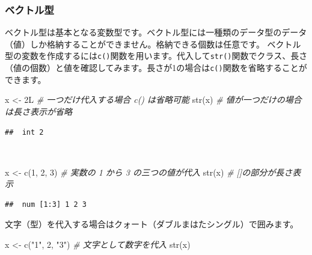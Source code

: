 \documentclass[
  12pt,
]{book}
\newenvironment{Shaded}{\begin{snugshade}}{\end{snugshade}}
\newcommand{\CommentTok}[1]{\textcolor[rgb]{0.56,0.35,0.01}{\textit{#1}}}
\newcommand{\DecValTok}[1]{\textcolor[rgb]{0.00,0.00,0.81}{#1}}
\newcommand{\FunctionTok}[1]{\textcolor[rgb]{0.00,0.00,0.00}{#1}}
\newcommand{\NormalTok}[1]{#1}
\newcommand{\OtherTok}[1]{\textcolor[rgb]{0.56,0.35,0.01}{#1}}
\newcommand{\StringTok}[1]{\textcolor[rgb]{0.31,0.60,0.02}{#1}}
\begin{document}
\hypertarget{ux30d9ux30afux30c8ux30ebux578b}{%
\subsubsection{ベクトル型}\label{ux30d9ux30afux30c8ux30ebux578b}}

ベクトル型は基本となる変数型です。ベクトル型には一種類のデータ型のデータ（値）しか格納することができません。格納できる個数は任意です。 ベクトル型の変数を作成するには\texttt{c()}関数を用います。代入して\texttt{str()}関数でクラス、長さ（値の個数）と値を確認してみます。長さが1の場合は\texttt{c()}関数を省略することができます。

\begin{Shaded}
\begin{Highlighting}[]
\NormalTok{x }\OtherTok{\textless{}{-}}\NormalTok{ 2L                 }\CommentTok{\# 一つだけ代入する場合 \textasciigrave{}c()\textasciigrave{} は省略可能}
\FunctionTok{str}\NormalTok{(x)                  }\CommentTok{\# 値が一つだけの場合は長さ表示が省略}
\end{Highlighting}
\end{Shaded}

\begin{verbatim}
##  int 2
\end{verbatim}

　

\begin{Shaded}
\begin{Highlighting}[]
\NormalTok{x }\OtherTok{\textless{}{-}} \FunctionTok{c}\NormalTok{(}\DecValTok{1}\NormalTok{, }\DecValTok{2}\NormalTok{, }\DecValTok{3}\NormalTok{)         }\CommentTok{\# 実数の 1 から 3 の三つの値が代入}
\FunctionTok{str}\NormalTok{(x)                  }\CommentTok{\# []の部分が長さ表示}
\end{Highlighting}
\end{Shaded}

\begin{verbatim}
##  num [1:3] 1 2 3
\end{verbatim}

文字（型）を代入する場合はクォート（ダブルまはたシングル）で囲みます。

\begin{Shaded}
\begin{Highlighting}[]
\NormalTok{x }\OtherTok{\textless{}{-}} \FunctionTok{c}\NormalTok{(}\StringTok{"1"}\NormalTok{, }\StringTok{\textquotesingle{}2\textquotesingle{}}\NormalTok{, }\StringTok{"3"}\NormalTok{)   }\CommentTok{\# 文字として数字を代入}
\FunctionTok{str}\NormalTok{(x)}
\end{Highlighting}
\end{Shaded}
\end{document}
